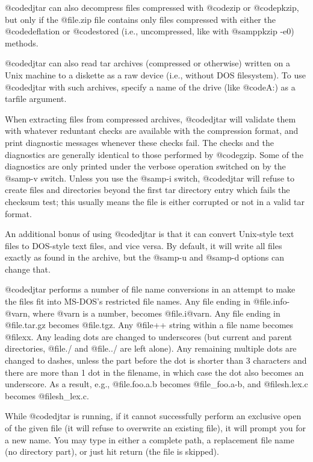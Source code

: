 @code{djtar} can also decompress files compressed with @code{zip} or
@code{pkzip}, but only if the @file{.zip} file contains only files
compressed with either the @code{deflation} or @code{stored} (i.e.,
uncompressed, like with @samp{pkzip -e0}) methods.

@code{djtar} can also read tar archives (compressed or otherwise) written
on a Unix machine to a diskette as a raw device (i.e., without DOS
filesystem).  To use @code{djtar} with such archives, specify a name
of the drive (like @code{A:}) as a tarfile argument.

When extracting files from compressed archives, @code{djtar} will
validate them with whatever reduntant checks are available with the
compression format, and print diagnostic messages whenever these checks
fail.  The checks and the diagnostics are generally identical to those
performed by @code{gzip}.  Some of the diagnostics are only printed under
the verbose operation switched on by the @samp{-v} switch.  Unless you use
the @samp{-i} switch, @code{djtar} will refuse to create files and
directories beyond the first tar directory entry which fails the checksum
test; this usually means the file is either corrupted or not in a valid
tar format.

An additional bonus of using @code{djtar} is that it can convert
Unix-style text files to DOS-style text files, and vice versa.  By
default, it will write all files exactly as found in the archive, but the
@samp{-u} and @samp{-d} options can change that.

@code{djtar} performs a number of file name conversions in an attempt
to make the files fit into MS-DOS's restricted file names.  Any file
ending in @file{.info-@var{n}}, where @var{n} is a number, becomes
@file{.i@var{n}}.  Any file ending in @file{.tar.gz} becomes
@file{.tgz}.  Any @file{++} string within a file name becomes @file{xx}.
Any leading dots are changed to underscores (but current and parent
directories, @file{./} and @file{../} are left alone).  Any remaining
multiple dots are changed to dashes, unless the part before the dot is
shorter than 3 characters and there are more than 1 dot in the filename,
in which case the dot also becomes an underscore.  As a result, e.g.,
@file{.foo.a.b} becomes @file{_foo.a-b}, and @file{sh.lex.c} becomes
@file{sh_lex.c}.

While @code{djtar} is running, if it cannot successfully perform an
exclusive open of the given file (it will refuse to overwrite an
existing file), it will prompt you for a new name.  You may type in
either a complete path, a replacement file name (no directory part), or
just hit return (the file is skipped).

